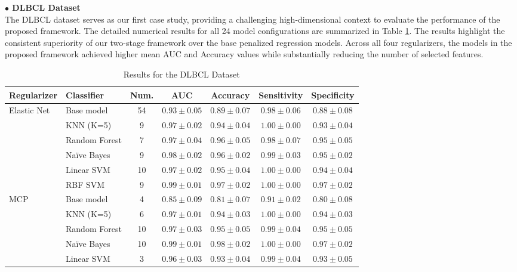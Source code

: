 \documentclass[twoside]{article}
\begin{document}
\noindent \textbf{$ \bullet $ DLBCL Dataset}\\
\noindent The DLBCL dataset serves as our first case study, providing a challenging high-dimensional context to evaluate the performance of the proposed framework. The detailed numerical results for all 24 model configurations are summarized in Table \ref{tab:dlbcl_details}. The results highlight the consistent superiority of our two-stage framework over the base penalized regression models. Across all four regularizers, the models in the proposed framework achieved higher mean AUC and Accuracy values while substantially reducing the number of selected features. 


\begin{table}[h!]
	\centering
	\small
	\caption{Results for the DLBCL Dataset}
	\label{tab:dlbcl_details}
	\begin{tabular}{|l|l|ccccc|}
		\hline
		Regularizer & Classifier & Num. & AUC & Accuracy & Sensitivity & Specificity \\
		\hline \hline
		{Elastic Net }
		& Base model   & 54 & $0.93 \pm 0.05$ & $0.89 \pm 0.07$ & $0.98 \pm 0.06$ & $0.88 \pm 0.08$ \\
		& KNN (K=5)    & 9  & $0.97 \pm 0.02$ & $0.94 \pm 0.04$ & $1.00 \pm 0.00$ & $0.93 \pm 0.04$ \\
		& Random Forest& 7  & $0.97 \pm 0.04$ & $0.96 \pm 0.05$ & $0.98 \pm 0.07$ & $0.95 \pm 0.05$ \\
		& Naïve Bayes  & 9  & $0.98 \pm 0.02$ & $0.96 \pm 0.02$ & $0.99 \pm 0.03$ & $0.95 \pm 0.02$ \\
		& Linear SVM   & 10 & $0.97 \pm 0.02$ & $0.95 \pm 0.04$ & $1.00 \pm 0.00$ & $0.94 \pm 0.04$ \\
		& RBF SVM      & 9  & $0.99 \pm 0.01$ & $0.97 \pm 0.02$ & $1.00 \pm 0.00$ & $0.97 \pm 0.02$ \\
		\hline
		{MCP}
		& Base model   & 4  & $0.85 \pm 0.09$ & $0.81 \pm 0.07$ & $0.91 \pm 0.02$ & $0.80 \pm 0.08$ \\
		& KNN (K=5)    & 6  & $0.97 \pm 0.01$ & $0.94 \pm 0.03$ & $1.00 \pm 0.00$ & $0.94 \pm 0.03$ \\
		& Random Forest& 10 & $0.97 \pm 0.03$ & $0.95 \pm 0.05$ & $0.99 \pm 0.04$ & $0.95 \pm 0.05$ \\
		& Naïve Bayes  & 10 & $0.99 \pm 0.01$ & $0.98 \pm 0.02$ & $1.00 \pm 0.00$ & $0.97 \pm 0.02$ \\
		& Linear SVM   & 3  & $0.96 \pm 0.03$ & $0.93 \pm 0.04$ & $0.99 \pm 0.04$ & $0.93 \pm 0.05$ \\

\end{tabular}
\end{table}
\end{document}
